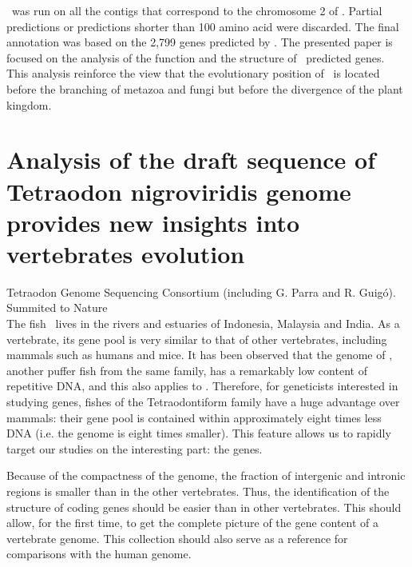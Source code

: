 \geneid\ was run on all the contigs that correspond to the
chromosome 2 of \Dd. Partial predictions or predictions shorter than
100 amino acid were discarded. The final annotation was based on the
2,799 genes predicted by \geneid. The presented paper is focused on
the analysis of the function and the structure of \geneid\ predicted
genes. This analysis reinforce the view that the evolutionary position
of \Dd\ is located before the branching of metazoa and fungi but
before the divergence of the plant kingdom.






\section*{Analysis of the draft sequence of Tetraodon nigroviridis genome
provides new insights into vertebrates evolution}

Tetraodon Genome Sequencing Consortium (including G. Parra and
R. Guig\'o). \\
Summited to Nature\\

The fish \TnL\ lives in the rivers and estuaries of Indonesia,
Malaysia and India. As a vertebrate, its gene pool is very similar to
that of other vertebrates, including mammals such as humans and mice.
It has been observed that the genome of \TrL, another puffer fish from
the same family, has a remarkably low content of repetitive DNA, and
this also applies to \Tn. Therefore, for geneticists interested in
studying genes, fishes of the Tetraodontiform family have a huge
advantage over mammals: their gene pool is contained within
approximately eight times less DNA (i.e. the genome is eight times
smaller). This feature allows us to rapidly target our studies on the
interesting part: the genes.

Because of the compactness of the genome, the fraction of intergenic
and intronic regions is smaller than in the other vertebrates. Thus,
the identification of the structure of coding genes should be easier
than in other vertebrates. This should allow, for the first time, to
get the complete picture of the gene content of a vertebrate genome.
This collection should also serve as a reference for comparisons with
the human genome.

